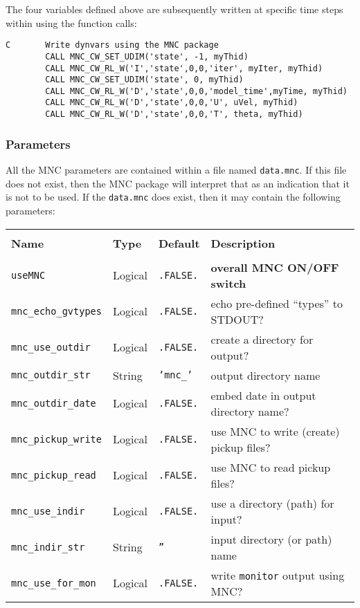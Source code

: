 The four variables defined above are subsequently written at specific
time steps within
using the function calls:
{\footnotesize
\begin{verbatim}
C       Write dynvars using the MNC package
        CALL MNC_CW_SET_UDIM('state', -1, myThid)
        CALL MNC_CW_RL_W('I','state',0,0,'iter', myIter, myThid)
        CALL MNC_CW_SET_UDIM('state', 0, myThid)
        CALL MNC_CW_RL_W('D','state',0,0,'model_time',myTime, myThid)
        CALL MNC_CW_RL_W('D','state',0,0,'U', uVel, myThid)
        CALL MNC_CW_RL_W('D','state',0,0,'T', theta, myThid)
\end{verbatim}
}


\subsubsection{Parameters}

All the MNC parameters are contained within a file named
\texttt{data.mnc}.  If this file does not exist, then the MNC package
will interpret that as an indication that it is not to be used.  If
the \texttt{data.mnc} does exist, then it may contain the following
parameters:

\begin{center}
  {\footnotesize
    \begin{tabular}[htb]{|l|l|l|l|}\hline
      &  &  &  \\
      \textbf{Name}  &  \textbf{Type}  &  
      \textbf{Default}  &  \textbf{Description}  \\\hline
      &  &  &  \\
      \texttt{useMNC}  &  Logical  & \texttt{.FALSE.}  &  
      \textbf{overall MNC ON/OFF switch}  \\
      \texttt{mnc\_echo\_gvtypes}  &  Logical  & \texttt{.FALSE.}  &  
      echo pre-defined ``types'' to STDOUT?   \\
      \texttt{mnc\_use\_outdir}  &  Logical  & \texttt{.FALSE.}  &  
      create a directory for output?  \\
      \texttt{mnc\_outdir\_str}  &  String  & \texttt{'mnc\_'}  &  
      output directory name \\
      \texttt{mnc\_outdir\_date}  &  Logical  & \texttt{.FALSE.}  &  
      embed date in output directory name?  \\
      \texttt{mnc\_pickup\_write}  &  Logical  & \texttt{.FALSE.}  &  
      use MNC to write (create) pickup files?  \\
      \texttt{mnc\_pickup\_read}  &  Logical  & \texttt{.FALSE.}  &  
      use MNC to read pickup files?  \\
      \texttt{mnc\_use\_indir}  &  Logical  & \texttt{.FALSE.}  &  
      use a directory (path) for input?  \\
      \texttt{mnc\_indir\_str}  &  String  & \texttt{''}  &  
      input directory (or path) name  \\
      \texttt{mnc\_use\_for\_mon}  &  Logical  & \texttt{.FALSE.}  &  
      write \texttt{monitor} output using MNC?  \\\hline
    \end{tabular}
  }
\end{center}


